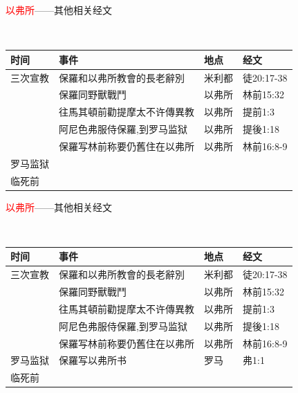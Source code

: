 \documentclass{beamer}
\begin{document}
\begin{frame}{\textcolor{red}{以弗所}——其他相关经文}
\begin{block}{}\\
\begin{table}
\hspace{-1.cm}
\begin{tabular}{l|l|l|l}
时间 & 事件 &地点&经文\\\hline\hline
三次宣教&保羅和以弗所教會的長老辭別&米利都&徒20:17-38\\
&保羅同野獸戰鬥&以弗所&林前15:32\\
&往馬其頓前勸提摩太不许傳異教&以弗所&提前1:3\\
&阿尼色弗服侍保羅,到罗马监狱&以弗所&提後1:18 \\
&保羅写林前称要仍舊住在以弗所&以弗所&林前16:8-9 \\\hline\hline
罗马监狱&&&\\\hline\hline
临死前&&&\\\hline\hline
\end{tabular}
\end{table}
\end{block}
\end{frame}


\begin{frame}{\textcolor{red}{以弗所}——其他相关经文}
\begin{block}{}\\
\begin{table}
\hspace{-1.cm}
\begin{tabular}{l|l|l|l}
时间 & 事件 &地点&经文\\\hline\hline
三次宣教&保羅和以弗所教會的長老辭別&米利都&徒20:17-38\\
&保羅同野獸戰鬥&以弗所&林前15:32\\
&往馬其頓前勸提摩太不许傳異教&以弗所&提前1:3\\
&阿尼色弗服侍保羅,到罗马监狱&以弗所&提後1:18 \\
&保羅写林前称要仍舊住在以弗所&以弗所&林前16:8-9 \\\hline\hline
罗马监狱&保羅写以弗所书&罗马&弗1:1\\\hline\hline
临死前&&&\\\hline\hline
\end{tabular}
\end{table}
\end{block}
\end{frame}
\end{document}
